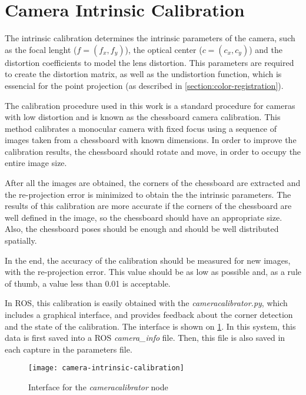 \section{Camera Intrinsic Calibration}
\label{section:camera-intrinsic-calibration}

The intrinsic calibration determines the intrinsic parameters of the camera, such as the focal lenght ($f = (f_x, f_y)$), the optical center ($c = (c_x, c_y)$) and the distortion coefficients to model the lens distortion. This parameters are required to create the distortion matrix, as well as the undistortion function, which is essencial for the point projection (as described in \cref{section:color-registration}).

The calibration procedure used in this work is a standard procedure for cameras with low distortion and is known as the chessboard camera calibration. This method calibrates a monocular camera with fixed focus using a sequence of images taken from a chessboard with known dimensions. In order to improve the calibration results, the chessboard should rotate and move, in order to occupy the entire image size.

After all the images are obtained, the corners of the chessboard are extracted and the re-projection error is minimized to obtain the the intrinsic parameters. The results of this calibration are more accurate if the corners of the chessboard are well defined in the image, so the chessboard should have an appropriate size. Also, the chessboard poses should be enough and should be well distributed spatially.

In the end, the accuracy of the calibration should be measured for new images, with the re-projection error. This value should be as low as possible and, as a rule of thumb, a value less than \num{0.01} is acceptable.

In ROS, this calibration is easily obtained with the \emph{cameracalibrator.py}, which includes a graphical interface, and provides feedback about the corner detection and the state of the calibration. The interface is shown on \cref{figure:camera-calibrator}. In this system, this data is first saved into a ROS \emph{camera\_info} file. Then, this file is also saved in each capture in the parameters file.

\begin{figure}
    
    \centering
    \texttt{[image: camera-intrinsic-calibration]}

    \caption{Interface for the \emph{cameracalibrator} node}
    \label{figure:camera-calibrator}

\end{figure}